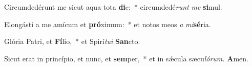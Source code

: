 \item Circumdedérunt me sicut aqua tota \textbf{di}e:~* circumdedé\hspace{0.03em}\textit{runt} \textit{me} \textbf{si}mul.
\item Elongásti a me amícum et \textbf{pró}ximum:~* et notos meos \textit{a} \textit{mi}\textbf{sé}ria.
\item Glória Patri, et \textbf{Fí}lio,~* et Spirí\hspace{0.03em}\textit{tui} \textbf{San}cto.
\item Sicut erat in princípio, et nunc, et \textbf{sem}per,~* et in sǽcula sæcu\hspace{0.03em}\textit{lórum.} \textbf{A}men.
